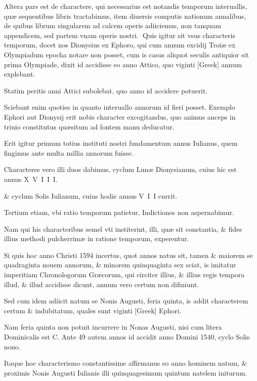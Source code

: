 \begin{parnumbers}

Altera pars est de charactere, qui necessarius est notandis temporum interuallis, quæ sequentibus libris tractabimus, item diuersis  computis nationum annalibus, de quibus librum singularem ad calcem operis adiiciemus, non tanquam appendicem, sed partem vnam operis nostri.
Quis igitur sit vsus characteris temporum, docet nos Dionysius ex Ephoro, qui cum annum excidij Troiæ ex Olympiadum epocha notare non posset, cum is casus aliquot seculis antiquior sit prima Olympiade, dixit id accidisse eo anno Attico, quo viginti \textgreek{[Greek]} annum explebant.

Statim peritis anni Attici subolebat, quo anno id accidere potuerit.

Sciebant enim quoties in quanto interuallo annorum id fieri posset. Exemplo Ephori aut Dionysij erit nobis character excogitandus, quo animus anceps in triuio constitutus quæsitum ad fontem manu deducatur.

Erit igitur primum  totius instituti nostri fundamentum annus Iulianus, quem fingimus ante multa millia annorum fuisse.

Characteres vero illi duos dabimus, cyclum Lunæ Dionysianum, cuius hic est annus X V I I I.

\& cyclum Solis Iulianum, cuius hodie annus V I I currit.

Tertium etiam, vbi ratio temporum patietur, Indictiones non aspernabimur.

Nam qui his characteribus semel vti institerint, illi, quæ sit constantia, \& fides illius methodi pulcherrimæ in ratione temporum, experentur.

Si quis hoc anno Christi 1594 incertus, quot annos natus sit, tamen \& maiorem se quadraginta nouem annorum, \& minorem quinquaginta sex sciat, is imitatur imperitiam Chronologorum Græcorum, qui circiter illius, \& illius regis tempora illud, \& illud accidisse dicunt, annum  vero certum non difiniunt.

Sed cum idem adiicit natum se Nonis Augusti, feria quinta, is addit characterem certum \& indubitatum, quales sunt viginti \textgreek{[Greek]} Ephori.

Nam feria quinta non potuit incurrere in Nonas Augusti, nisi cum litera Dominicalis est C. Ante 49 autem annos id accidit anno Domini 1540, cyclo Solis nono.

Itaque hoc characterismo constantissime affirmanus eo anno hominem natum, \& proximis Nonis Augusti Iulianis illi quinquagesimum quintum natelem initurum.


\end{parnumbers}

